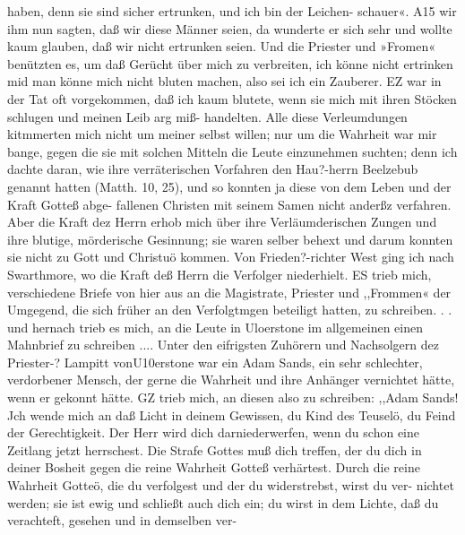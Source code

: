 haben, denn sie sind sicher ertrunken, und ich bin der Leichen-
schauer«. A15 wir ihm nun sagten, daß wir diese Männer seien,
da wunderte er sich sehr und wollte kaum glauben, daß wir nicht
ertrunken seien. Und die Priester und »Fromen« benützten es, um
daß Gerücht über mich zu verbreiten, ich könne nicht ertrinken mid
man könne mich nicht bluten machen, also sei ich ein Zauberer.
EZ war in der Tat oft vorgekommen, daß ich kaum blutete, wenn
sie mich mit ihren Stöcken schlugen und meinen Leib arg miß-
handelten. Alle diese Verleumdungen kitmmerten mich nicht um
meiner selbst willen; nur um die Wahrheit war mir bange,
gegen die sie mit solchen Mitteln die Leute einzunehmen suchten;
denn ich dachte daran, wie ihre verräterischen Vorfahren den
Hau?-herrn Beelzebub genannt hatten (Matth. 10, 25), und so
konnten ja diese von dem Leben und der Kraft Gotteß abge-
fallenen Christen mit seinem Samen nicht anderßz verfahren. Aber
die Kraft dez Herrn erhob mich über ihre Verläumderischen Zungen
und ihre blutige, mörderische Gesinnung; sie waren selber behext
und darum konnten sie nicht zu Gott und Christuö kommen.
Von Frieden?-richter West ging ich nach Swarthmore, wo
die Kraft deß Herrn die Verfolger niederhielt. ES trieb mich,
verschiedene Briefe von hier aus an die Magistrate, Priester und
,,Frommen« der Umgegend, die sich früher an den Verfolgtmgen
beteiligt hatten, zu schreiben. . . und hernach trieb es mich, an
die Leute in Uloerstone im allgemeinen einen Mahnbrief zu
schreiben ....
Unter den eifrigsten Zuhörern und Nachsolgern dez Priester-?
Lampitt vonU10erstone war ein Adam Sands, ein sehr schlechter,
verdorbener Mensch, der gerne die Wahrheit und ihre Anhänger
vernichtet hätte, wenn er gekonnt hätte. GZ trieb mich, an diesen
also zu schreiben:
,,Adam Sands!
Jch wende mich an daß Licht in deinem Gewissen, du Kind
des Teuselö, du Feind der Gerechtigkeit. Der Herr wird dich
darniederwerfen, wenn du schon eine Zeitlang jetzt herrschest. Die
Strafe Gottes muß dich treffen, der du dich in deiner Bosheit gegen
die reine Wahrheit Gotteß verhärtest. Durch die reine Wahrheit
Gotteö, die du verfolgest und der du widerstrebst, wirst du ver-
nichtet werden; sie ist ewig und schließt auch dich ein; du wirst
in dem Lichte, daß du verachteft, gesehen und in demselben ver-



